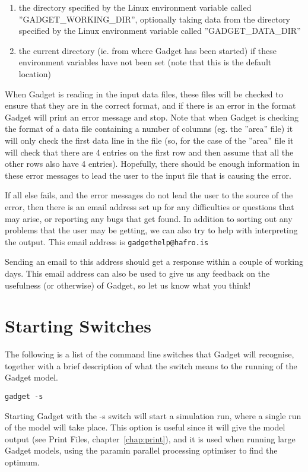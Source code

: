 \documentclass[10pt,twoside]{book}
\begin{document}
\begin{enumerate}
\item the directory specified by the Linux environment variable called
  ''GADGET\_WORKING\_DIR'', optionally taking data from the directory
  specified by the Linux environment variable called
  ''GADGET\_DATA\_DIR''
\item the current directory (ie. from where Gadget has been started)
  if these environment variables have not been set (note that this is
  the default location)
\end{enumerate}

When Gadget is reading in the input data files, these files will be
checked to ensure that they are in the correct format, and if there is
an error in the format Gadget will print an error message and stop.
Note that when Gadget is checking the format of a data file containing
a number of columns (eg. the ''area'' file) it will only check the
first data line in the file (so, for the case of the ''area'' file it
will check that there are 4 entries on the first row and then assume
that all the other rows also have 4 entries).  Hopefully, there should
be enough information in these error messages to lead the user to the
input file that is causing the error.

\bigskip If all else fails, and the error messages do not lead the
user to the source of the error, then there is an email address set up
for any difficulties or questions that may arise, or reporting any
bugs that get found.  In addition to sorting out any problems that the
user may be getting, we can also try to help with interpreting the
output.  This email address is {\tt gadgethelp@hafro.is}

\bigskip Sending an email to this address should get a response within
a couple of working days.  This email address can also be used to give
us any feedback on the usefulness (or otherwise) of Gadget, so let us
know what you think!

\section{Starting Switches}\label{sec:starting}
The following is a list of the command line switches that Gadget will
recognise, together with a brief description of what the switch means
to the running of the Gadget model.

{\small\begin{verbatim}
gadget -s
\end{verbatim}}
Starting Gadget with the -s switch will start a simulation run, where a single run of the model will take place.  This option is useful since it will give the model output (see Print Files, chapter~\ref{chap:print}), and it is used when running large Gadget models, using the paramin parallel processing optimiser to find the optimum.
\end{document}
